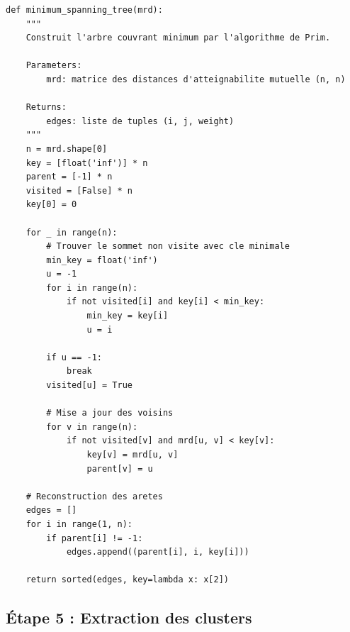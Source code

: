 \documentclass[11pt,a4paper]{article}
\begin{document}
\begin{lstlisting}[caption=Algorithme de Prim pour le MST]
def minimum_spanning_tree(mrd):
    """
    Construit l'arbre couvrant minimum par l'algorithme de Prim.
    
    Parameters:
        mrd: matrice des distances d'atteignabilite mutuelle (n, n)
    
    Returns:
        edges: liste de tuples (i, j, weight)
    """
    n = mrd.shape[0]
    key = [float('inf')] * n
    parent = [-1] * n
    visited = [False] * n
    key[0] = 0
    
    for _ in range(n):
        # Trouver le sommet non visite avec cle minimale
        min_key = float('inf')
        u = -1
        for i in range(n):
            if not visited[i] and key[i] < min_key:
                min_key = key[i]
                u = i
        
        if u == -1:
            break
        visited[u] = True
        
        # Mise a jour des voisins
        for v in range(n):
            if not visited[v] and mrd[u, v] < key[v]:
                key[v] = mrd[u, v]
                parent[v] = u
    
    # Reconstruction des aretes
    edges = []
    for i in range(1, n):
        if parent[i] != -1:
            edges.append((parent[i], i, key[i]))
    
    return sorted(edges, key=lambda x: x[2])
\end{lstlisting}

\subsection{Étape 5 : Extraction des clusters}
\end{document}
